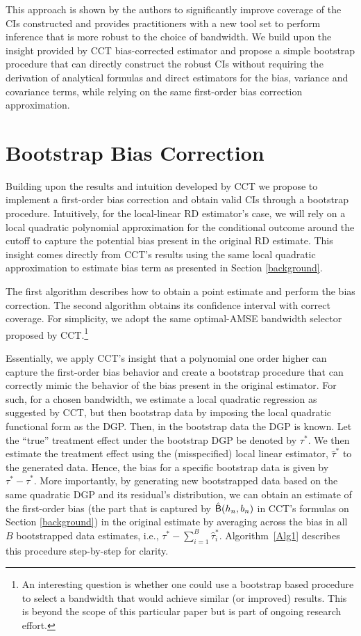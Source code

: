 \documentclass[12pt,fleqn]{article}
\begin{document}
This approach is shown by the authors to significantly improve coverage of the CIs constructed and provides practitioners with a new tool set to perform inference that is more robust to the choice of bandwidth. We build upon the insight provided by CCT bias-corrected estimator and propose a simple bootstrap procedure that can directly construct the robust CIs without requiring the derivation of analytical formulas and direct estimators for the bias, variance and covariance terms, while relying on the same first-order bias correction approximation.

\section{Bootstrap Bias Correction}\label{boot}

Building upon the results and intuition developed by CCT we propose to implement a first-order bias correction and obtain valid CIs through a bootstrap procedure.
Intuitively, for the local-linear RD estimator's case, we will rely on a local quadratic polynomial approximation for the conditional outcome around the cutoff to capture the potential bias present in the original RD estimate. This insight comes directly from CCT's results using the same local quadratic approximation to estimate bias term as presented in Section \ref{background}.

The first algorithm describes how to obtain a point estimate and perform the bias correction. The second algorithm obtains its confidence interval with correct coverage. For simplicity, we adopt the same optimal-AMSE bandwidth selector proposed by CCT.\footnote{An interesting question is whether one could use a bootstrap based procedure to select a bandwidth that would achieve similar (or improved) results. This is beyond the scope of this particular paper but is part of ongoing research effort.} 

Essentially, we apply CCT's insight that a polynomial one order higher can capture the first-order bias behavior and create a bootstrap procedure that can correctly mimic the behavior of the bias present in the original estimator. For such, for a chosen bandwidth, we estimate a local quadratic regression as suggested by CCT, but then bootstrap data by imposing the local quadratic functional form as the DGP. Then, in the bootstrap data the DGP is known. Let the ``true'' treatment effect under the bootstrap DGP be denoted by $\tau^{*}$. We then estimate the treatment effect using the (misspecified) local linear estimator, $\hat{\tau}^{*}$ to the generated data. Hence, the bias for a specific bootstrap data is given by $\tau^{*}-\hat{\tau}^{*}$. More importantly, by generating new bootstrapped data based on the same quadratic DGP and its residual's distribution, we can obtain an estimate of the first-order bias (the part that is captured by $\hat{\mathsf{B}}(h_{n},b_{n})$ in CCT's formulas on Section \ref{background}) in the original estimate by averaging across the bias in all $B$ bootstrapped data estimates, i.e., $\tau^{*} - \sum_{i = 1}^{B} \hat{\tau}_{ i}^{*}$. Algorithm~\ref{Alg1} describes this procedure step-by-step for clarity.
\end{document}
